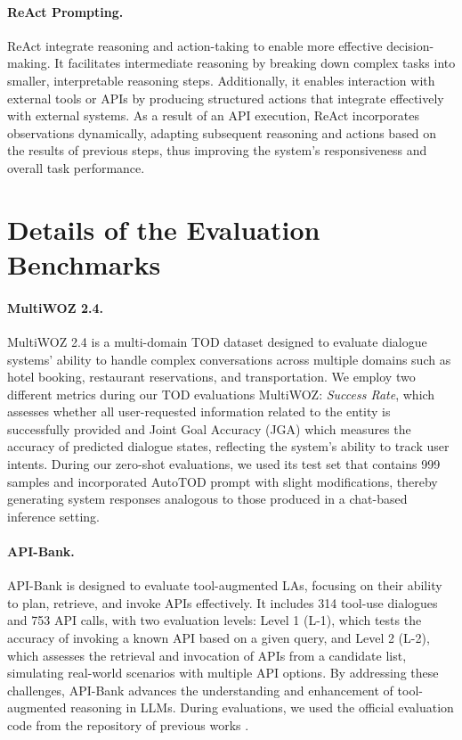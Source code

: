 \paragraph{ReAct Prompting.} ReAct \cite{yao2023reactsynergizingreasoningacting-react} integrate reasoning and action-taking to enable more effective decision-making. It facilitates intermediate reasoning by breaking down complex tasks into smaller, interpretable reasoning steps. Additionally, it enables interaction with external tools or APIs by producing structured actions that integrate effectively with external systems. As a result of an API execution, ReAct incorporates observations dynamically, adapting subsequent reasoning and actions based on the results of previous steps, thus improving the system's responsiveness and overall task performance.

\section{Details of the Evaluation Benchmarks}
\label{app:benchmark-details}

\paragraph{MultiWOZ 2.4.} MultiWOZ 2.4 \cite{ye-etal-2022-multiwoz} is a multi-domain TOD dataset designed to evaluate dialogue systems' ability to handle complex conversations across multiple domains such as hotel booking, restaurant reservations, and transportation. We employ two different metrics during our TOD evaluations MultiWOZ: \textit{Success Rate}, which assesses whether all user-requested information related to the entity is successfully provided and Joint Goal Accuracy (JGA) which measures the accuracy of predicted dialogue states, reflecting the system's ability to track user intents. During our zero-shot evaluations, we used its test set that contains 999 samples and incorporated AutoTOD prompt \cite{xu-etal-2024-rethinking} with slight modifications, thereby generating system responses analogous to those produced in a chat-based inference setting.

\paragraph{API-Bank.} API-Bank \cite{li-etal-2023-apibank} is designed to evaluate tool-augmented LAs, focusing on their ability to plan, retrieve, and invoke APIs effectively. It includes 314 tool-use dialogues and 753 API calls, with two evaluation levels: Level 1 (L-1), which tests the accuracy of invoking a known API based on a given query, and Level 2 (L-2), which assesses the retrieval and invocation of APIs from a candidate list, simulating real-world scenarios with multiple API options. By addressing these challenges, API-Bank advances the understanding and enhancement of tool-augmented reasoning in LLMs. During evaluations, we used the official evaluation code from the repository of previous works \cite{Lin2024Hammer}.


